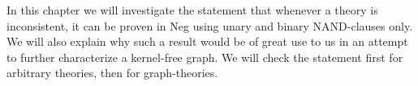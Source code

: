 In this chapter we will investigate the statement that whenever a theory is inconsistent, it can be proven in Neg using unary and binary NAND-clauses only.
We will also explain why such a result would be of great use to us in an attempt to further characterize a kernel-free graph.
We will check the statement first for arbitrary theories, then for graph-theories.
